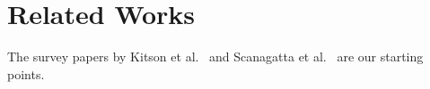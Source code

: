 \section{Related Works}
The survey papers by Kitson et al.~\cite{kitson2023survey} and Scanagatta et al.~\cite{scanagatta2019survey} are our starting points.